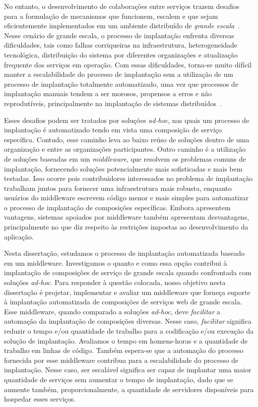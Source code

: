 No entanto, o desenvolvimento de colaborações entre serviços 
trazem desafios para a formulação de mecanismos que funcionem, 
escalem e que sejam eficientemente implementados 
em um ambiente distribuído de \emph{grande escala}~\cite{Steen2011VeryLarge}.
Nesse cenário de grande escala,
o processo de implantação enfrenta diversas dificuldades, 
tais como falhas corriqueiras na infraestrutura, 
heterogeneidade tecnológica, 
distribuição do sistema por diferentes organizações
e atualização frequente dos serviços em operação.
Com essas dificuldades, torna-se muito difícil manter a escalabilidade do processo de implantação
sem a utilização de um processo de implantação totalmente automatizado,
uma vez que processos de implantação manuais tendem a ser
morosos, propensos a erros e não reprodutíveis, principalmente
na implantação de sistemas distribuídos~\cite{Dolstra2005Configuration}.

Esses desafios podem ser tratados por soluções \emph{ad-hoc},
nas quais um processo de implantação é automatizado tendo em vista
uma composição de serviço específica.
Contudo, esse caminho leva ao baixo reúso de soluções
dentro de uma organização e entre as organizações participantes.
Outro caminho é a utilização de soluções baseadas em um \emph{middleware},
que resolvem os problemas comuns de implantação,
fornecendo soluções potencialmente mais sofisticadas e mais bem testadas.
Isso ocorre pois contribuidores interessados no problema de implantação
trabalham juntos para fornecer uma infraestrutura mais robusta,
enquanto usuários do middleware escrevem código menor e mais simples
para automatizar o processo de implantação de composições específicas.
Embora apresentem vantagens, sistemas apoiados por middleware
também apresentam desvantagens, principalmente no que diz respeito
às restrições impostas ao desenvolvimento da aplicação.

Nesta dissertação, estudamos o processo de implantação automatizada baseado em um middleware. 
Investigamos o quanto e como essa opção
contribui à implantação de composições de serviço de grande escala
quando confrontada com soluções \emph{ad-hoc}.
Para responder à questão colocada, nosso objetivo nesta dissertação é 
projetar, implementar e avaliar
um middleware que forneça suporte à implantação automatizada de composições de serviços web
de grande escala.
Esse middleware, quando comparado a soluções \emph{ad-hoc},
deve \emph{facilitar} a automação da implantação de composições diversas.
Nesse caso, \emph{facilitar} significa reduzir o tempo e/ou quantidade de trabalho
para a codificação e/ou execução da solução de implantação.
Avaliamos o tempo em homens-horas e a quantidade de trabalho
em linhas de código.
Também espera-se que a automação do processo fornecida por esse middleware
contribua para a escalabilidade do processo de implantação.
Nesse caso, ser escalável significa ser capaz de implantar uma maior quantidade
de serviços sem aumentar o tempo de implantação, dado que se aumente também,
proporcionalmente, a quantidade de servidores disponíveis para hospedar esses serviços.

